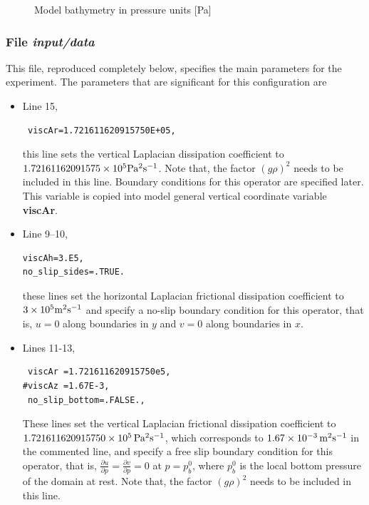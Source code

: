 {\begin{figure}[t]
\begin{center}
    \caption{Model bathymetry in pressure units [Pa]}
    \label{fig:model_bathymetry_pcoord}
  \end{center}
\end{figure}

\subsubsection{File {\it input/data}}

This file, reproduced completely below, specifies the main parameters 
for the experiment. The parameters that are significant for this configuration
are

\begin{itemize}

\item Line 15, 
\begin{verbatim} viscAr=1.721611620915750E+05, \end{verbatim}
this line sets the vertical Laplacian dissipation coefficient to
$1.72161162091575 \times 10^{5} {\rm Pa^{2}s^{-1}}$. Note that, the factor
$(g\rho)^2$ needs to be included in this line. Boundary conditions
for this operator are specified later. This variable is copied into
model general vertical coordinate variable {\bf viscAr}.


\item Line 9--10, 
\begin{verbatim}
viscAh=3.E5,
no_slip_sides=.TRUE.
\end{verbatim} 
  these lines set the horizontal Laplacian frictional dissipation
  coefficient to $3 \times 10^{5} {\rm m^{2}s^{-1}}$ and specify a
  no-slip boundary condition for this operator, that is, $u=0$ along
  boundaries in $y$ and $v=0$ along boundaries in $x$.

\item Lines 11-13,
\begin{verbatim}
 viscAr =1.721611620915750e5,
#viscAz =1.67E-3,
 no_slip_bottom=.FALSE.,
\end{verbatim}
  These lines set the vertical Laplacian frictional dissipation
  coefficient to $1.721611620915750 \times
  10^{5}\mbox{\,Pa$^{2}$s$^{-1}$}$, which corresponds to
  $1.67\times10^{-3}\mbox{\,m$^{2}$s$^{-1}$}$ in the commented line, and
  specify a free slip boundary condition for this operator, that is,
  $\frac{\partial u}{\partial p}=\frac{\partial v}{\partial p}=0$ at
  $p=p_{b}^{0}$, where $p_{b}^{0}$ is the local bottom pressure of the
  domain at rest. Note that, the factor $(g\rho)^2$ needs to be
  included in this line.


\end{itemize}}

